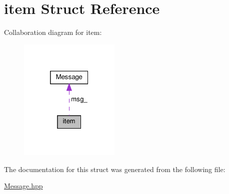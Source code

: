 \hypertarget{structitem}{}\section{item Struct Reference}
\label{structitem}


Collaboration diagram for item\+:\nopagebreak
\begin{figure}[H]
\begin{center}
\leavevmode
\includegraphics[width=136pt]{structitem__coll__graph}
\end{center}
\end{figure}


The documentation for this struct was generated from the following file\+:\begin{DoxyCompactItemize}
\item 
\hyperlink{Message_8hpp}{Message.\+hpp}\end{DoxyCompactItemize}
